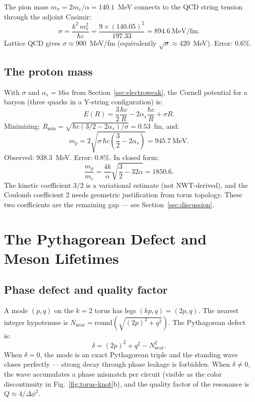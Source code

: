 \documentclass[11pt,a4paper]{article}
\begin{document}
The pion mass $m_\pi = 2m_e/\alpha = 140.1$~MeV connects to the QCD string tension through the adjoint Casimir:
\begin{equation}
  \sigma = \frac{k^2\, m_\pi^2}{\hbar c} = \frac{9 \times (140.05)^2}{197.33} = 894.6~\text{MeV/fm}.
  \label{eq:string-tension}
\end{equation}
Lattice QCD gives $\sigma \approx 900$~MeV/fm (equivalently $\sqrt{\sigma} \approx 420$~MeV). Error: 0.6\%.

\subsection{The proton mass}

With $\sigma$ and $\alpha_s = 16\alpha$ from Section~\ref{sec:electroweak}, the Cornell potential for a baryon (three quarks in a Y-string configuration) is:
\begin{equation}
  E(R) = \frac{3}{2}\frac{\hbar c}{R} - 2\alpha_s\frac{\hbar c}{R} + \sigma R.
  \label{eq:cornell}
\end{equation}
Minimizing: $R_{\min} = \sqrt{\hbar c(3/2 - 2\alpha_s)/\sigma} = 0.53$~fm, and:
\begin{equation}
  m_p = 2\sqrt{\sigma\,\hbar c\left(\frac{3}{2} - 2\alpha_s\right)} = 945.7~\text{MeV}.
  \label{eq:proton-mass}
\end{equation}
Observed: 938.3~MeV. Error: 0.8\%. In closed form:
\begin{equation}
  \frac{m_p}{m_e} = \frac{4k}{\alpha}\sqrt{\frac{3}{2} - 32\alpha} = 1850.6.
  \label{eq:proton-ratio}
\end{equation}
The kinetic coefficient $3/2$ is a variational estimate (not NWT-derived), and the Coulomb coefficient 2 needs geometric justification from torus topology. These two coefficients are the remaining gap --- see Section~\ref{sec:discussion}.

\section{The Pythagorean Defect and Meson Lifetimes}
\label{sec:defect}

\subsection{Phase defect and quality factor}

A mode $(p,q)$ on the $k=2$ torus has legs $(kp, q) = (2p, q)$. The nearest integer hypotenuse is $N_{\text{near}} = \text{round}(\sqrt{(2p)^2 + q^2})$. The Pythagorean defect is:
\begin{equation}
  \delta = (2p)^2 + q^2 - N_{\text{near}}^2.
  \label{eq:defect}
\end{equation}
When $\delta = 0$, the mode is an exact Pythagorean triple and the standing wave closes perfectly --- strong decay through phase leakage is forbidden. When $\delta \neq 0$, the wave accumulates a phase mismatch per circuit (visible as the color discontinuity in Fig.~\ref{fig:torus-knot}b), and the quality factor of the resonance is $Q \approx 4/\Delta\phi^2$.
\end{document}
